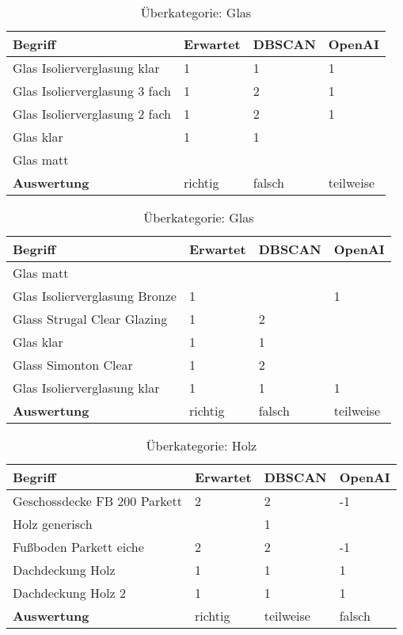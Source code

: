 \begin{table}[h]
	
	\centering
	\begin{tabular}{|l|l|l|l|}
		\hline
		\textbf{Begriff} & \textbf{Erwartet} & \textbf{DBSCAN} & \textbf{OpenAI}\\ \hline
		Glas Isolierverglasung klar & 1 & 1 & 1 \\ \hline
		Glas Isolierverglasung 3 fach & 1 & 2 & 1 \\ \hline
		Glas Isolierverglasung 2 fach & 1 & 2 & 1 \\ \hline
		Glas klar & 1 & 1 & ~ \\ \hline
		Glas matt & ~ & ~ & ~ \\ \hline
		\textbf{Auswertung} & richtig & falsch & teilweise\\ \hline
	\end{tabular}
	\caption{Überkategorie: Glas}
	\label{t:evaluation-example16}
\end{table}

\begin{table}[h]
	
	\centering
	\begin{tabular}{|l|l|l|l|}
		\hline
		\textbf{Begriff} & \textbf{Erwartet} & \textbf{DBSCAN} & \textbf{OpenAI}\\ \hline
		Glas matt & ~ & ~ & ~ \\ \hline
		Glas Isolierverglasung Bronze & 1 & ~ & 1 \\ \hline
		Glass Strugal Clear Glazing & 1 & 2 & ~ \\ \hline
		Glas klar & 1 & 1 & ~ \\ \hline
		Glass Simonton Clear & 1 & 2 & ~ \\ \hline
		Glas Isolierverglasung klar & 1 & 1 & 1 \\ \hline
		\textbf{Auswertung} & richtig & falsch & teilweise \\ \hline
	\end{tabular}
	\caption{Überkategorie: Glas}
	\label{t:evaluation-example17}
\end{table}

\begin{table}[h]
	
	\centering
	\begin{tabular}{|l|l|l|l|}
		\hline
		\textbf{Begriff} & \textbf{Erwartet} & \textbf{DBSCAN} & \textbf{OpenAI}\\ \hline
		 Geschossdecke FB 200 Parkett & 2 & 2 & -1 \\ \hline
		 Holz generisch & ~ & 1 & ~ \\ \hline
		 Fußboden Parkett eiche & 2 & 2 & -1 \\ \hline
		 Dachdeckung Holz & 1 & 1 & 1 \\ \hline
		 Dachdeckung Holz 2 & 1 & 1 & 1 \\ \hline
		\textbf{Auswertung} & richtig & teilweise & falsch \\ \hline
	\end{tabular}
	\caption{Überkategorie: Holz}
	\label{t:evaluation-example18}
\end{table}

